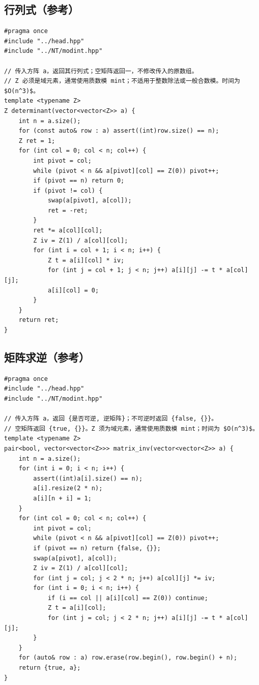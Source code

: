 \subsection{行列式（参考）}
\par

\begin{lstlisting}
#pragma once
#include "../head.hpp"
#include "../NT/modint.hpp"

// 传入方阵 a，返回其行列式；空矩阵返回一，不修改传入的原数组。
// Z 必须是域元素，通常使用质数模 mint；不适用于整数除法或一般合数模。时间为 $O(n^3)$。
template <typename Z>
Z determinant(vector<vector<Z>> a) {
    int n = a.size();
    for (const auto& row : a) assert((int)row.size() == n);
    Z ret = 1;
    for (int col = 0; col < n; col++) {
        int pivot = col;
        while (pivot < n && a[pivot][col] == Z(0)) pivot++;
        if (pivot == n) return 0;
        if (pivot != col) {
            swap(a[pivot], a[col]);
            ret = -ret;
        }
        ret *= a[col][col];
        Z iv = Z(1) / a[col][col];
        for (int i = col + 1; i < n; i++) {
            Z t = a[i][col] * iv;
            for (int j = col + 1; j < n; j++) a[i][j] -= t * a[col][j];
            a[i][col] = 0;
        }
    }
    return ret;
}
\end{lstlisting}

\subsection{矩阵求逆（参考）}
\par

\begin{lstlisting}
#pragma once
#include "../head.hpp"
#include "../NT/modint.hpp"

// 传入方阵 a，返回 {是否可逆, 逆矩阵}；不可逆时返回 {false, {}}。
// 空矩阵返回 {true, {}}。Z 须为域元素，通常使用质数模 mint；时间为 $O(n^3)$。
template <typename Z>
pair<bool, vector<vector<Z>>> matrix_inv(vector<vector<Z>> a) {
    int n = a.size();
    for (int i = 0; i < n; i++) {
        assert((int)a[i].size() == n);
        a[i].resize(2 * n);
        a[i][n + i] = 1;
    }
    for (int col = 0; col < n; col++) {
        int pivot = col;
        while (pivot < n && a[pivot][col] == Z(0)) pivot++;
        if (pivot == n) return {false, {}};
        swap(a[pivot], a[col]);
        Z iv = Z(1) / a[col][col];
        for (int j = col; j < 2 * n; j++) a[col][j] *= iv;
        for (int i = 0; i < n; i++) {
            if (i == col || a[i][col] == Z(0)) continue;
            Z t = a[i][col];
            for (int j = col; j < 2 * n; j++) a[i][j] -= t * a[col][j];
        }
    }
    for (auto& row : a) row.erase(row.begin(), row.begin() + n);
    return {true, a};
}
\end{lstlisting}

